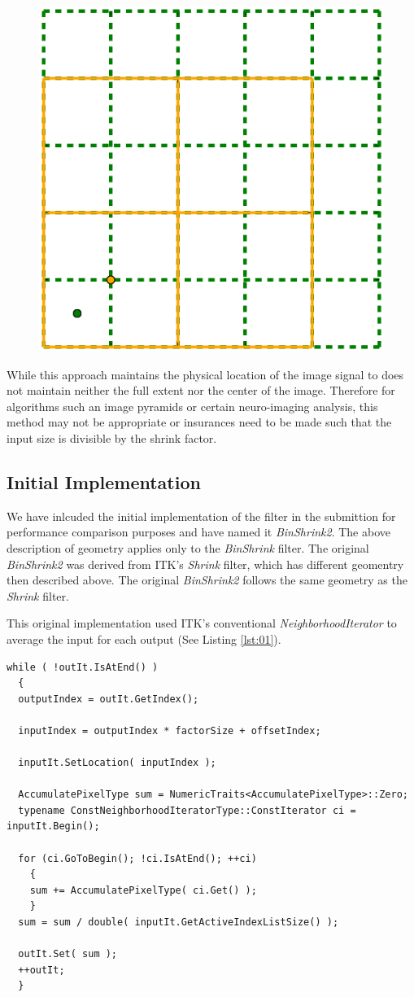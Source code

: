 \documentclass{InsightArticle}
\begin{document}
\begin{figure}
  \centering
  \includegraphics[width=0.4\linewidth]{images/pixelgrid}
  \label{fig:PixelGrid}
\end{figure}

While this approach maintains the physical location of the image
signal to does not maintain neither the full extent nor the
center of the image. Therefore for algorithms such an image pyramids or certain
neuro-imaging analysis, this method may not be appropriate or
insurances need to be made such that the input size is divisible by the shrink factor.

\subsection{Initial Implementation}

We have inlcuded the initial implementation of the filter in the
submittion for performance comparison purposes and have named it
\textit{BinShrink2}. The above description of geometry applies only to the
\textit{BinShrink} filter. The original \textit{BinShrink2} was
derived from ITK's \textit{Shrink} filter, which has different
geomentry then described above. The original \textit{BinShrink2}
follows the same geometry as the \textit{Shrink} filter.

This original implementation used ITK's conventional
\textit{NeighborhoodIterator} to average the input for each output
(See Listing \ref{lst:01}).

\begin{lstlisting}[label=lst:01, caption={A selected section of code
      from \textit{BinShrink2} filter using the neighborhood iterator.}]
while ( !outIt.IsAtEnd() )
  {
  outputIndex = outIt.GetIndex();

  inputIndex = outputIndex * factorSize + offsetIndex;

  inputIt.SetLocation( inputIndex );

  AccumulatePixelType sum = NumericTraits<AccumulatePixelType>::Zero;
  typename ConstNeighborhoodIteratorType::ConstIterator ci = inputIt.Begin();

  for (ci.GoToBegin(); !ci.IsAtEnd(); ++ci)
    {
    sum += AccumulatePixelType( ci.Get() );
    }
  sum = sum / double( inputIt.GetActiveIndexListSize() );

  outIt.Set( sum );
  ++outIt;
  }
\end{lstlisting}
\end{document}
